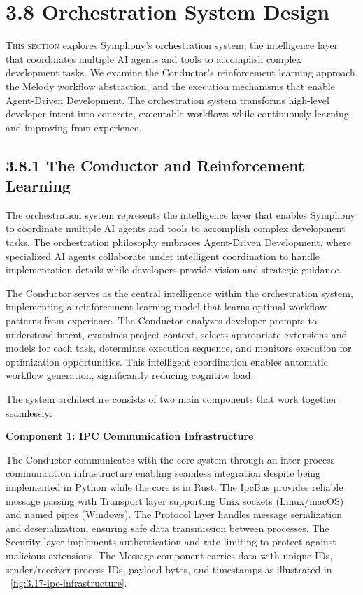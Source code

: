 \clearpage
\section{3.8 Orchestration System Design}
\label{sec:orchestration-system}

\lettrine{T}{his section} explores Symphony's orchestration system, the intelligence layer that coordinates multiple AI agents and tools to accomplish complex development tasks. We examine the Conductor's reinforcement learning approach, the Melody workflow abstraction, and the execution mechanisms that enable Agent-Driven Development. The orchestration system transforms high-level developer intent into concrete, executable workflows while continuously learning and improving from experience.

\subsection*{3.8.1 The Conductor and Reinforcement Learning}

The orchestration system represents the intelligence layer that enables Symphony to coordinate multiple AI agents and tools to accomplish complex development tasks. The orchestration philosophy embraces Agent-Driven Development, where specialized AI agents collaborate under intelligent coordination to handle implementation details while developers provide vision and strategic guidance.

The Conductor serves as the central intelligence within the orchestration system, implementing a reinforcement learning model that learns optimal workflow patterns from experience. The Conductor analyzes developer prompts to understand intent, examines project context, selects appropriate extensions and models for each task, determines execution sequence, and monitors execution for optimization opportunities. This intelligent coordination enables automatic workflow generation, significantly reducing cognitive load.

The system architecture consists of two main components that work together seamlessly:

\clearpage
\textbf{Component 1: IPC Communication Infrastructure}

The Conductor communicates with the core system through an inter-process communication infrastructure enabling seamless integration despite being implemented in Python while the core is in Rust. The IpcBus provides reliable message passing with Transport layer supporting Unix sockets (Linux/macOS) and named pipes (Windows). The Protocol layer handles message serialization and deserialization, ensuring safe data transmission between processes. The Security layer implements authentication and rate limiting to protect against malicious extensions. The Message component carries data with unique IDs, sender/receiver process IDs, payload bytes, and timestamps as illustrated in ~\ref{fig:3.17-ipc-infrastructure}.

